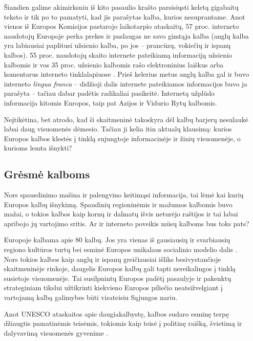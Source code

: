 \begin{multicols}{2}
Šiandien galime akimirksniu iš kito pasaulio krašto parsisiųsti keletą gigabaitų teksto ir tik po to pamatyti, kad jis parašytas kalba, kurios nesuprantame. Anot vienos iš Europos Komisijos pastarojo laikotarpio ataskaitų, 57 proc. interneto naudotojų Europoje perka prekes ir paslaugas ne savo gimtąja kalba (anglų kalba yra labiausiai paplitusi užsienio kalba, po jos – prancūzų, vokiečių ir ispanų kalbos). 55 proc. naudotojų skaito internete pateikiamą informaciją užsienio kalbomis ir vos 35 proc. užsienio kalbomis rašo elektroninius laiškus arba komentarus interneto tinklalapiuose \cite{EC1}.  Prieš kelerius metus anglų kalba gal ir buvo interneto \textit{lingua franca}  – didžioji dalis internete pateikiamos informacijos buvo ja parašyta – tačiau dabar padėtis radikaliai pasikeitė. Internetą užplūdo informacija kitomis Europos, taip pat Azijos ir Vidurio Rytų kalbomis. 

Neįtikėtina, bet atrodo, kad ši skaitmeninė takoskyra dėl kalbų barjerų nesulaukė labai daug visuomenės dėmesio. Tačiau ji kelia itin aktualų klausimą: kurios Europos kalbos klestės į tinklą sujungtoje informacinėje ir žinių visuomenėje, o kurioms lemta išnykti?

\subsection{Grėsmė kalboms }

Nors spausdinimo mašina ir palengvino keitimąsi informacija, tai lėmė kai kurių Europos kalbų išnykimą. Spaudinių regioninėmis ir mažumos kalbomis buvo mažai, o tokios kalbos kaip kornų ir dalmatų išvis neturėjo raštijos ir tai labai apribojo  jų vartojimo sritis. Ar ir interneto poveikis mūsų kalboms bus toks pats?

Europoje kalbama apie 80 kalbų. Jos yra vienas iš gausiausių ir svarbiausių  regiono kultūros turtų bei esminė Europos unikalaus socialinio modelio dalis \cite{EC2}.  Nors tokios kalbos kaip anglų ir ispanų greičiausiai išliks besivystančioje skaitmeninėje rinkoje, daugelis Europos kalbų gali tapti nereikalingos į tinklą susietoje visuomenėje. Tai susilpnintų Europos padėtį pasaulyje ir pakenktų strateginiam tikslui užtikrinti kiekvieno Europos piliečio neatsižvelgiant į vartojamą kalbą galimybes būti visateisiu Sąjungos nariu.  


Anot UNESCO ataskaitos apie daugiakalbystę, kalbos sudaro esminę terpę džiaugtis pamatinėmis teisėmis, tokiomis kaip teisė į politinę raišką, švietimą ir dalyvavimą visuomenės gyvenime \cite{Unesco1}.


\end{multicols}
